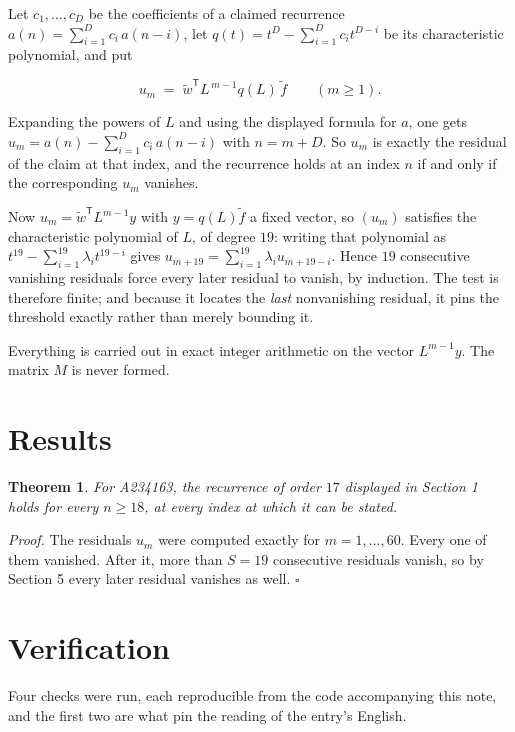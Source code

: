 \documentclass[11pt]{article}
\newtheorem{theorem}{Theorem}
\theoremstyle{definition}
\begin{document}
Let $c_1,\dots,c_D$ be the coefficients of a claimed recurrence $a(n) = \sum_{i=1}^{D} c_i\,a(n-i)$, let $q(t) = t^{D} - \sum_{i=1}^{D} c_i t^{D-i}$ be its characteristic polynomial, and put

\[u_m \;=\; \tilde w^{\mathsf T} L^{\,m-1} q(L)\,\tilde f \qquad (m \ge 1).\]

Expanding the powers of $L$ and using the displayed formula for $a$, one gets $u_m = a(n) - \sum_{i=1}^{D} c_i\,a(n-i)$ with $n = m + D$. So $u_m$ is exactly the residual of the claim at that index, and the recurrence holds at an index $n$ if and only if the corresponding $u_m$ vanishes.

Now $u_m = \tilde w^{\mathsf T} L^{m-1} y$ with $y = q(L)\tilde f$ a fixed vector, so $(u_m)$ satisfies the characteristic polynomial of $L$, of degree $19$: writing that polynomial as $t^{19} - \sum_{i=1}^{19} \lambda_i t^{19-i}$ gives $u_{m+19} = \sum_{i=1}^{19} \lambda_i u_{m+19-i}$. Hence $19$ consecutive vanishing residuals force every later residual to vanish, by induction. The test is therefore finite; and because it locates the {\itshape last} nonvanishing residual, it pins the threshold exactly rather than merely bounding it.

Everything is carried out in exact integer arithmetic on the vector $L^{m-1}y$. The matrix $M$ is never formed.

\section{Results}

\begin{theorem} For A234163, the recurrence of order $17$ displayed in Section 1 holds for every $n \ge 18$, at every index at which it can be stated.\end{theorem}

{\itshape Proof.} The residuals $u_m$ were computed exactly for $m = 1,\dots,60$. Every one of them vanished. After it, more than $S = 19$ consecutive residuals vanish, so by Section 5 every later residual vanishes as well. $\square$

\section{Verification}

Four checks were run, each reproducible from the code accompanying this note, and the first two are what pin the reading of the entry's English.
\end{document}

